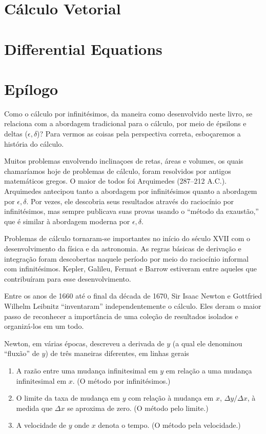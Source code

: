 \documentclass{svmono}
\begin{document}
\chapterproblems

\chapter{Cálculo Vetorial}
\label{chp:vectorcalculus}

\chapterproblems

\chapter{Differential Equations}
\label{chp:diffeq}

\chapterproblems

\chapter*{Epílogo}

Como o cálculo por infinitésimos, da maneira como desenvolvido neste livro,
se relaciona com a abordagem tradicional para o cálculo, por meio de
épsilons e deltas ($\epsilon,\delta$)?
Para vermos as coisas pela perspectiva correta,
esboçaremos a história do cálculo.

Muitos problemas envolvendo inclinaçoes de retas, áreas e volumes, os quais
chamaríamos hoje de problemas de cálculo, foram resolvidos por antigos
matemáticos gregos. O maior de todos foi Arquimedes (287--212 A.C.).
Arquimedes antecipou tanto a abordagem por infinitésimos quanto a
abordagem por $\epsilon,\delta$. Por vezes, ele descobria seus resultados
através do raciocínio por infinitésimos, mas sempre publicava suas provas
usando o ``método da exaustão,'' que é similar à abordagem moderna por
$\epsilon,\delta$.

Problemas de cálculo tornaram-se importantes no início do século
XVII com o desenvolvimento da física e da astronomia. As regras
básicas de derivação e integração foram descobertas naquele período
por meio do raciocínio informal com infinitésimos. Kepler, Galileu,
Fermat e Barrow estiveram entre aqueles que contribuíram para esse
desenvolvimento.

Entre os anos de 1660 até o final da década de 1670, Sir Isaac Newton e
Gottfried Wilhelm Leibnitz ``inventaram'' independentemente o cálculo.
Eles deram o maior passo de reconhecer a importância de uma coleção
de resultados isolados e organizá-los em um todo.

Newton, em várias épocas, descreveu a derivada de $y$ (a qual ele
denominou ``fluxão'' de $y$) de
três maneiras diferentes, em linhas gerais
\begin{enumerate}[(1)]
\item A razão entre uma mudança infinitesimal em $y$ em relação a
      uma mudança infinitesimal em $x$. (O método por infinitésimos.)
\item O limite da taxa de mudança em $y$ com relação à mudança em $x$,
      $\Delta y / \Delta x$, à medida que $\Delta x$ se aproxima de
      zero. (O método pelo limite.)
\item A velocidade de $y$ onde $x$ denota o tempo. (O método pela
      velocidade.)
\end{enumerate}
\end{document}
